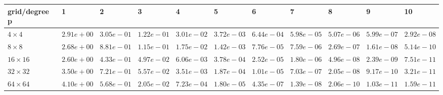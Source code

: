 \begin{tabular}{lllllllllll}
\hline
 grid/degree p   & 1          & 2          & 3          & 4          & 5          & 6          & 7          & 8          & 9          & 10         \\
\hline
 $4 \times 4$    & $2.91e+00$ & $3.05e-01$ & $1.22e-01$ & $3.01e-02$ & $3.72e-03$ & $6.44e-04$ & $5.98e-05$ & $5.07e-06$ & $5.99e-07$ & $2.92e-08$ \\
 $8 \times 8$    & $2.68e+00$ & $8.81e-01$ & $1.15e-01$ & $1.75e-02$ & $1.42e-03$ & $7.76e-05$ & $7.59e-06$ & $2.69e-07$ & $1.61e-08$ & $5.14e-10$ \\
 $16 \times 16$  & $2.60e+00$ & $4.33e-01$ & $4.97e-02$ & $6.06e-03$ & $3.78e-04$ & $2.52e-05$ & $1.80e-06$ & $4.96e-08$ & $2.39e-09$ & $7.51e-11$ \\
 $32 \times 32$  & $3.50e+00$ & $7.21e-01$ & $5.57e-02$ & $3.51e-03$ & $1.87e-04$ & $1.01e-05$ & $7.03e-07$ & $2.05e-08$ & $9.17e-10$ & $3.21e-11$ \\
 $64 \times 64$  & $4.10e+00$ & $5.68e-01$ & $2.05e-02$ & $7.23e-04$ & $1.80e-05$ & $4.35e-07$ & $1.39e-08$ & $2.06e-10$ & $1.03e-11$ & $1.59e-11$ \\
\hline
\end{tabular}
